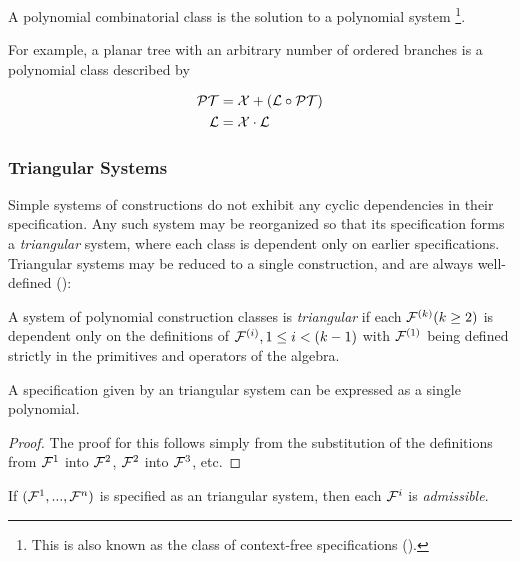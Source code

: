 \begin{df}
A polynomial combinatorial class is the solution to a polynomial system%
\footnote{This is also known as the class of context-free specifications (\cite{FlajoletSedgewick2009}).}.
\end{df}

\noindent
For example, a planar tree with an arbitrary number of ordered branches
is a polynomial class described by

\begin{align*}
\mathcal{PT} & = \mathcal{X} + (\mathcal{L} \circ \mathcal{PT})\\
\mathcal{L} & = \mathcal{X} \cdot \mathcal{L}
\end{align*}

\subsubsection{Triangular Systems}
Simple systems of constructions do not exhibit any cyclic dependencies in their specification.
Any such system may be reorganized so that 
its specification forms a \emph{triangular} system,
where each class is dependent only on earlier specifications.
Triangular systems  may be reduced to a single construction,
and are always well-defined (\cite{FlajoletSedgewick2009}):

\begin{df}
A system of polynomial construction classes is \emph{triangular}
if each $\mathcal{F}^{(k)} (k \ge 2)$ is dependent only on the definitions of $\mathcal{F}^{(i)}, 1 \le i < (k-1)$
with $\mathcal{F}^{(1)}$ being defined strictly in the primitives and operators of the algebra.
\end{df}
\noindent

\begin{prop} \label{prop:iterativeOGF}
A specification given by an triangular system can be expressed as a single polynomial.
\end{prop}
\begin{proof}
The proof for this follows simply from the substitution of the definitions
from $\mathcal{F}^{1}$ into $\mathcal{F}^{2}$, $\mathcal{F}^{2}$ into $\mathcal{F}^{3}$, etc.
\end{proof}

\begin{corollary}
If $(\mathcal{F}^{1}, ..., \mathcal{F}^{n})$ is specified as an triangular system,
then each $\mathcal{F}^{i}$ is  \emph{admissible}.
\end{corollary}

